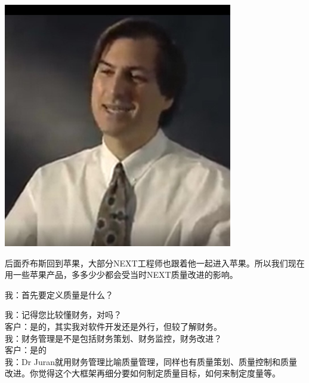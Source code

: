\includegraphics[width=10cm]{jobs1Screenshot_2022-06-12_082703.jpg}

后面乔布斯回到苹果，大部分NEXT工程师也跟着他一起进入苹果。所以我们现在用一些苹果产品，多多少少都会受当时NEXT质量改进的影响。

我：首先要定义质量是什么？\\




我：记得您比较懂财务，对吗？\\
客户：是的，其实我对软件开发还是外行，但较了解财务。\\
我：财务管理是不是包括财务策划、财务监控，财务改进？\\
客户：是的\\
我：Dr
Juran就用财务管理比喻质量管理，同样也有质量策划、质量控制和质量改进。你觉得这个大框架再细分要如何制定质量目标，如何来制定度量等。

